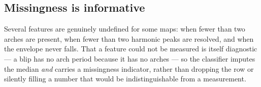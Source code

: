 \subsection*{Missingness is informative}

Several features are genuinely undefined for some maps:
 when fewer than two arches are present,
 when fewer than two harmonic peaks are resolved, and
 when the envelope never falls.
That a feature could not be measured is itself
diagnostic --- a blip has no arch period because it has no arches --- so the
classifier imputes the median \emph{and} carries a missingness indicator,
rather than dropping the row or silently filling a number that would be
indistinguishable from a measurement.
